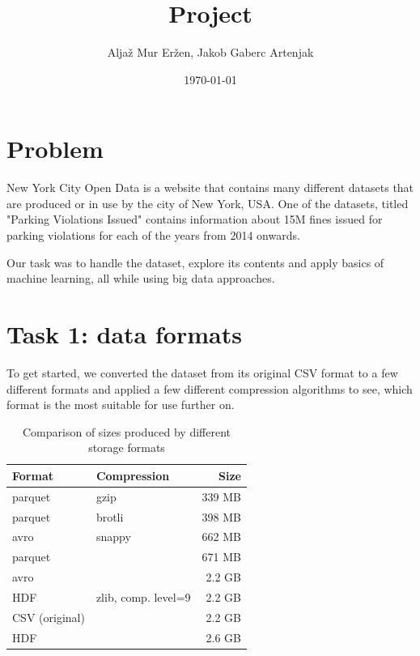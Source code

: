 \documentclass[12pt]{fphw}
\title{Project}
\author{Aljaž Mur Eržen, Jakob Gaberc Artenjak}
\date{\today}
\institute{Faculty of computer and information science \\ Univerisity of Ljubljana}
\begin{document}
\maketitle

\section{Problem}

New York City Open Data is a website that contains many different datasets that are produced or in use by the city of New York, USA. One of the datasets, titled "Parking Violations Issued" \cite{violations-2021} contains information about 15M fines issued for parking violations for each of the years from 2014 onwards.

Our task was to handle the dataset, explore its contents and apply basics of machine learning, all while using big data approaches.

\section{Task 1: data formats}

To get started, we converted the dataset from its original CSV format to a few different formats and applied a few different compression algorithms to see, which format is the most suitable for use further on.

\begin{table}[h!]
\begin{center}
\begin{tabular}{l l r}
  Format & Compression & Size \\
  \hline
  parquet        & gzip                & 339 MB \\
  parquet        & brotli              & 398 MB \\
  avro           & snappy              & 662 MB \\
  parquet        &                     & 671 MB \\
  avro           &                     & 2.2 GB \\  
  HDF            & zlib, comp. level=9 & 2.2 GB \\
  CSV (original) &                     & 2.2 GB \\
  HDF            &                     & 2.6 GB \\
\end{tabular}
\caption{Comparison of sizes produced by different storage formats}
\label{table-formats}
\end{center}
\end{table}
\end{document}
